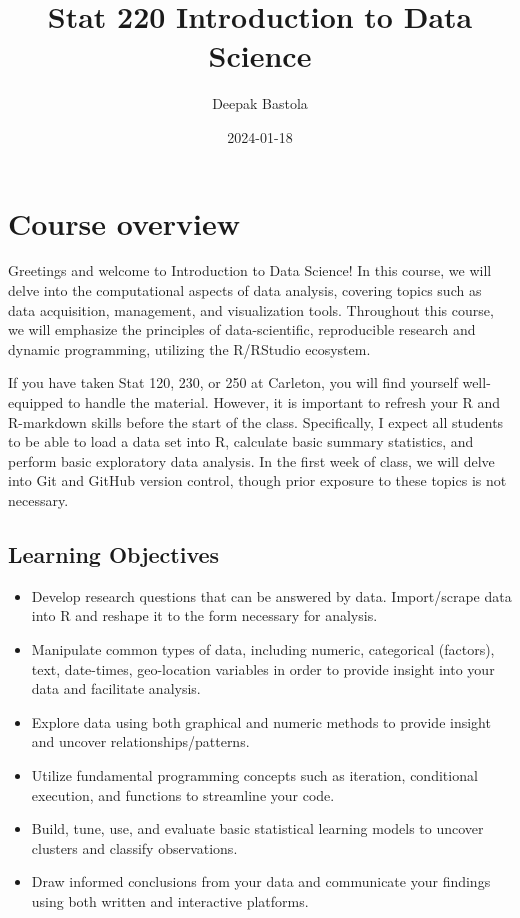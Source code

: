 \documentclass[
]{book}
\title{Stat 220 Introduction to Data Science}
\author{Deepak Bastola}
\date{2024-01-18}
\providecommand{\tightlist}{%
  \setlength{\itemsep}{0pt}\setlength{\parskip}{0pt}}
\begin{document}
\maketitle

{
\setcounter{tocdepth}{1}
\tableofcontents
}
\hypertarget{course-overview}{%
\chapter*{Course overview}\label{course-overview}}

Greetings and welcome to Introduction to Data Science! In this course, we will delve into the computational aspects of data analysis, covering topics such as data acquisition, management, and visualization tools. Throughout this course, we will emphasize the principles of data-scientific, reproducible research and dynamic programming, utilizing the R/RStudio ecosystem.

If you have taken Stat 120, 230, or 250 at Carleton, you will find yourself well-equipped to handle the material. However, it is important to refresh your R and R-markdown skills before the start of the class. Specifically, I expect all students to be able to load a data set into R, calculate basic summary statistics, and perform basic exploratory data analysis. In the first week of class, we will delve into Git and GitHub version control, though prior exposure to these topics is not necessary.

\hypertarget{learning-objectives}{%
\section{Learning Objectives}\label{learning-objectives}}

\begin{itemize}
\tightlist
\item
  Develop research questions that can be answered by data. Import/scrape data into R and reshape it to the form necessary for analysis.
\item
  Manipulate common types of data, including numeric, categorical (factors), text, date-times, geo-location variables in order to provide insight into your data and facilitate analysis.
\item
  Explore data using both graphical and numeric methods to provide insight and uncover relationships/patterns.
\item
  Utilize fundamental programming concepts such as iteration, conditional execution, and functions to streamline your code.
\item
  Build, tune, use, and evaluate basic statistical learning models to uncover clusters and classify observations.
\item
  Draw informed conclusions from your data and communicate your findings using both written and interactive platforms.
\end{itemize}
\end{document}
